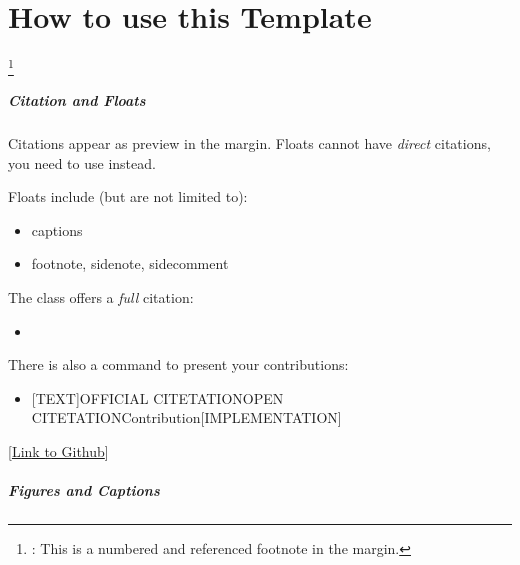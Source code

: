


\chapter{How to use this Template}


\lipsum[1-1]%
\footnote{\detokenize{\footnote}: This is a numbered and referenced footnote in the margin.} 
\lipsum[2-2]%


\paragraph{Citation and Floats}

Citations \cite{cryptoeprint:2021/1484} appear as preview in the margin. 
Floats cannot have \emph{direct} citations, 
you need to use \detokenize{\citeonly} instead.

Floats include (but are not limited to):
\begin{itemize}
	\item captions
	\item footnote, sidenote, sidecomment
\end{itemize}

The class offers a \emph{full} citation:
\begin{itemize}
 	\item \detokenize{\fullfullcite}
 \end{itemize} 


There is also a command to present your contributions:

\begin{itemize}
	\item \detokenize{\contentsource}[TEXT]{OFFICIAL CITETATION}{OPEN CITETATION}{Contribution}[IMPLEMENTATION]
\end{itemize}
[\url{Link to Github}]



\FloatBarrier
\paragraph{Figures and Captions}

